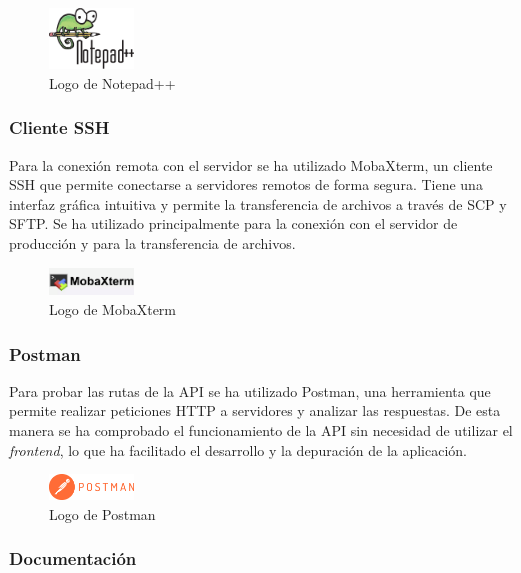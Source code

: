 \begin{figure}[H]
    \centering
    \includegraphics[width=0.2\textwidth]{figures/7-Construccion/Notepad.png}
    \caption{Logo de Notepad++}
\end{figure}


\subsubsection{Cliente SSH}
Para la conexión remota con el servidor se ha utilizado MobaXterm\cite{mobaxterm}, un cliente SSH que permite conectarse a servidores remotos de forma segura.
Tiene una interfaz gráfica intuitiva y permite la transferencia de archivos a través de SCP y SFTP.
Se ha utilizado principalmente para la conexión con el servidor de producción y para la transferencia de archivos.

\begin{figure}[H]
    \centering
    \includegraphics[width=0.2\textwidth]{figures/7-Construccion/MobaXterm.png}
    \caption{Logo de MobaXterm}
\end{figure}

\subsubsection{Postman}
Para probar las rutas de la API se ha utilizado Postman\cite{postman}, una herramienta que permite realizar peticiones HTTP a servidores y analizar las respuestas.
De esta manera se ha comprobado el funcionamiento de la API sin necesidad de utilizar el \textit{frontend}, lo que ha facilitado el desarrollo y la depuración de la aplicación.

\begin{figure}[H]
    \centering
    \includegraphics[width=0.2\textwidth]{figures/7-Construccion/Postman.png}
    \caption{Logo de Postman}
\end{figure}


\subsubsection{Documentación}

